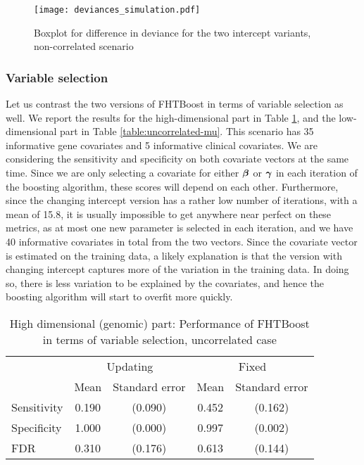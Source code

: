 \begin{figure}
\caption{Boxplot for difference in deviance for the two intercept variants, non-correlated scenario}
\label{fig:simulation-uncorrelated-deviances-boxplot}
\centering
\texttt{[image: deviances\_simulation.pdf]}
\end{figure}

\subsubsection{Variable selection}
Let us contrast the two versions of FHTBoost in terms of variable selection as well.
We report the results for the high-dimensional part in Table \ref{table:uncorrelated-y0}, and the low-dimensional part in Table \ref{table:uncorrelated-mu}.
This scenario has 35 informative gene covariates and 5 informative clinical covariates.
We are considering the sensitivity and specificity on both covariate vectors at the same time.
Since we are only selecting a covariate for either $\boldsymbol{\beta}$ or $\boldsymbol{\gamma}$ in each iteration of the boosting algorithm, these scores will depend on each other.
Furthermore, since the changing intercept version has a rather low number of iterations, with a mean of 15.8, it is usually impossible to get anywhere near perfect on these metrics, as at most one new parameter is selected in each iteration, and we have 40 informative covariates in total from the two vectors.
Since the covariate vector is estimated on the training data, a likely explanation is that the version with changing intercept captures more of the variation in the training data.
In doing so, there is less variation to be explained by the covariates, and hence the boosting algorithm will start to overfit more quickly.

\begin{table}
\caption{High dimensional (genomic) part: Performance of FHTBoost in terms of variable selection, uncorrelated case}
\label{table:uncorrelated-y0}
\centering
\begin{tabular}{l|cc|cc}
\toprule
& \multicolumn{2}{c}{Updating} & \multicolumn{2}{c}{Fixed} \\
& Mean & Standard error & Mean & Standard error \\
\hline
Sensitivity & 0.190 & (0.090) & 0.452 & (0.162) \\
Specificity & 1.000 & (0.000) & 0.997 & (0.002) \\
FDR         & 0.310 & (0.176) & 0.613 & (0.144) \\
\bottomrule
\end{tabular}
\end{table}

